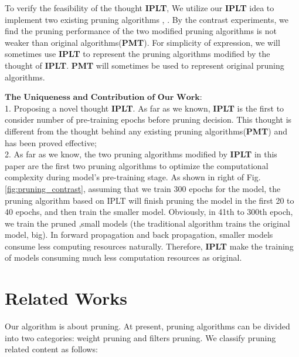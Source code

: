 \documentclass[runningheads]{llncs}
\begin{document}
To verify the feasibility of the thought \textbf{IPLT}, We utilize our \textbf{IPLT} idea to implement two existing pruning algorithms \cite{b35}, \cite{b27}. By the contrast experiments, we find the pruning performance of the two modified pruning algorithms is not weaker than original algorithms(\textbf{PMT}). For simplicity of expression, we will sometimes use \textbf{IPLT} to represent the pruning algorithms modified by the thought of \textbf{IPLT}.  \textbf{PMT} will sometimes be used to represent original pruning algorithms.

$\textbf{The Uniqueness and Contribution of Our Work:}$\\
1.  Proposing a novel thought \textbf{IPLT}. As far as we known, \textbf{IPLT} is the first to consider number of pre-training epochs before pruning decision. This thought is different from the thought behind any existing pruning algorithms(\textbf{PMT}) and has been proved effective;\\
2. As far as we know, the two pruning algorithms modified by \textbf{IPLT} in this paper are the first two pruning algorithms to optimize the computational complexity during model's pre-training stage. As shown in right of Fig.\ref{fig:pruning_contrast}, assuming that we train 300 epochs for the model, the pruning algorithm based on IPLT will finish pruning the model in the first 20 to 40 epochs, and then train the smaller model. Obviously, in 41th to 300th epoch, we train the pruned ,small models (the traditional algorithm trains the original model, big). In forward propagation and back propagation, smaller models consume less computing resources naturally. Therefore, \textbf{IPLT} make the training of models consuming much less computation resources as original.\\


\section{Related Works}
Our algorithm is about pruning. At present, pruning algorithms can be divided into two categories: weight pruning and filters pruning. We classify pruning related content as follows:
\end{document}

